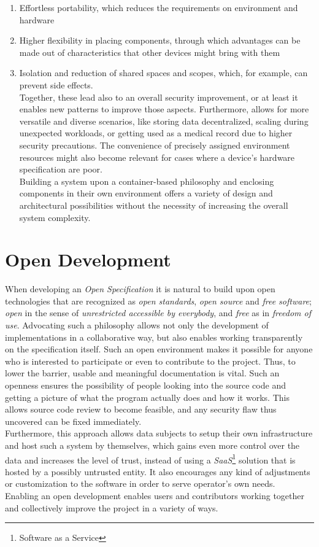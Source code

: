 \documentclass[12pt,english,a4paper,titlepage,cleardoublepage=empty,dottedtoc]{report}
\providecommand{\tightlist}{%
  \setlength{\itemsep}{0pt}\setlength{\parskip}{0pt}}
\begin{document}
\begin{enumerate}
\def\labelenumi{(\Alph{enumi})}
\tightlist
\item
  Effortless portability, which reduces the requirements on environment
  and hardware
\item
  Higher flexibility in placing components, through which advantages can
  be made out of characteristics that other devices might bring with
  them
\item
  Isolation and reduction of shared spaces and scopes, which, for
  example, can prevent side effects.\\
  Together, these lead also to an overall security improvement, or at
  least it enables new patterns to improve those aspects. Furthermore,
  allows for more versatile and diverse scenarios, like storing data
  decentralized, scaling during unexpected workloads, or getting used as
  a medical record due to higher security precautions. The convenience
  of precisely assigned environment resources might also become relevant
  for cases where a device's hardware specification are poor.\\
  Building a system upon a container-based philosophy and enclosing
  components in their own environment offers a variety of design and
  architectural possibilities without the necessity of increasing the
  overall system complexity.
\end{enumerate}

\section{Open Development}\label{open-development}

When developing an \emph{Open Specification} it is natural to build upon
open technologies that are recognized as \emph{open standards},
\emph{open source} and \emph{free software}; \emph{open} in the sense of
\emph{unrestricted accessible by everybody}, and \emph{free} as in
\emph{freedom of use}. Advocating such a philosophy allows not only the
development of implementations in a collaborative way, but also enables
working transparently on the specification itself. Such an open
environment makes it possible for anyone who is interested to
participate or even to contribute to the project. Thus, to lower the
barrier, usable and meaningful documentation is vital. Such an openness
ensures the possibility of people looking into the source code and
getting a picture of what the program actually does and how it works.
This allows source code review to become feasible, and any security flaw
thus uncovered can be fixed immediately.\\
Furthermore, this approach allows data subjects to setup their own
infrastructure and host such a system by themselves, which gains even
more control over the data and increases the level of trust, instead of
using a \emph{SaaS}\footnote{Software as a Service} solution that is
hosted by a possibly untrusted entity. It also encourages any kind of
adjustments or customization to the software in order to serve
operator's own needs.\\
Enabling an open development enables users and contributors working
together and collectively improve the project in a variety of ways.
\end{document}
